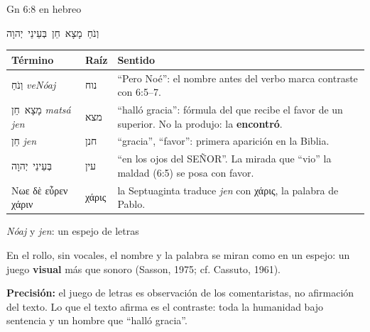 \documentclass[hyperref={bookmarks=false},aspectratio=169]{beamer}
\newcommand{\heb}[1]{\mbox{\foreignlanguage{hebrew}{#1}}}
\newcommand{\grc}[1]{\foreignlanguage{ancientgreek}{#1}}
\newcommand{\SENOR}{S{\fontsize{0.78em}{1em}\selectfont EÑOR}}
\newcommand{\destacar}[1]{\textbf{\textcolor{azul}{#1}}}
\newcommand{\precision}[1]{{\footnotesize\color{gris}\textbf{Precisión:} #1}}
\begin{document}
\begin{frame}{Gn 6:8 en hebreo}
\begin{center}
{\Large\heb{וְנֹחַ מָצָא חֵן בְּעֵינֵי יְהוָה}}
\end{center}
\renewcommand{\arraystretch}{1.15}\scriptsize
\begin{tabular}{@{}>{\RaggedRight\arraybackslash}p{2.9cm}>{\RaggedRight\arraybackslash}p{1.3cm}>{\RaggedRight\arraybackslash}p{7.6cm}@{}}
\toprule
\textbf{Término} & \textbf{Raíz} & \textbf{Sentido} \\ \midrule
\heb{וְנֹחַ} \emph{veNóaj} & \heb{נוח} & ``Pero Noé'': el nombre antes del verbo marca contraste con 6:5--7. \\
\heb{מָצָא חֵן} \emph{matsá jen} & \heb{מצא} & ``halló gracia'': fórmula del que recibe el favor de un superior. No la produjo: la \destacar{encontró}. \\
\heb{חֵן} \emph{jen} & \heb{חנן} & ``gracia'', ``favor'': primera aparición en la Biblia. \\
\heb{בְּעֵינֵי יְהוָה} & \heb{עין} & ``en los ojos del \SENOR''. La mirada que ``vio'' la maldad (6:5) se posa con favor. \\
\grc{Νωε δὲ εὗρεν χάριν} & \grc{χάρις} & la Septuaginta traduce \emph{jen} con \grc{χάρις}, la palabra de Pablo. \\
\bottomrule
\end{tabular}
\end{frame}

\begin{frame}{\emph{Nóaj} y \emph{jen}: un espejo de letras}
\centering
{}\par\medskip
\small\RaggedRight En el rollo, sin vocales, el nombre y la palabra se miran como en un espejo: un juego \destacar{visual} más que sonoro (Sasson, 1975; cf. Cassuto, 1961).\par\smallskip
\precision{el juego de letras es observación de los comentaristas, no afirmación del texto. Lo que el texto afirma es el contraste: toda la humanidad bajo sentencia y un hombre que ``halló gracia''.}
\end{frame}
\end{document}
